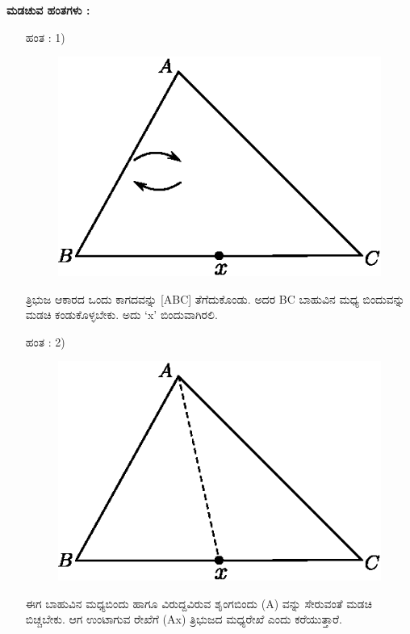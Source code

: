 \begin{enumerate}
    \noindent
 \textbf{ಮಡಚುವ ಹಂತಗಳು :}
 
 \begin{itemize}
 \item[ಹಂತ : 1)] 
 ~
 \begin{figure}[H]
\centering
\includegraphics[scale=.98]{src/figure/chap1/fig1-36a.eps}
\end{figure}
 
ತ್ರಿಭುಜ ಆಕಾರದ ಒಂದು ಕಾಗದವನ್ನು [ABC] ತೆಗೆದುಕೊಂಡು. ಅದರ BC ಬಾಹುವಿನ ಮಧ್ಯ ಬಿಂದುವನ್ನು ಮಡಚಿ ಕಂಡುಕೊಳ್ಳಬೇಕು. ಅದು  `x' ಬಿಂದುವಾಗಿರಲಿ. 
 
 \item[ಹಂತ : 2)]
 ~
 \begin{figure}[H]
\centering
\includegraphics[scale=.98]{src/figure/chap1/fig1-36b.eps}
\end{figure}
 
 ಈಗ ಬಾಹುವಿನ ಮಧ್ಯಬಿಂದು ಹಾಗೂ ವಿರುದ್ದವಿರುವ ಶೃಂಗಬಿಂದು (A) ವನ್ನು ಸೇರುವಂತೆ ಮಡಚಿ ಬಿಚ್ಚಬೇಕು. ಆಗ ಉಂಟಾಗುವ ರೇಖೆಗೆ (Ax) ತ್ರಿಭುಜದ ಮಧ್ಯರೇಖೆ ಎಂದು ಕರೆಯುತ್ತಾರೆ. 
 

\end{itemize}
\end{enumerate}
